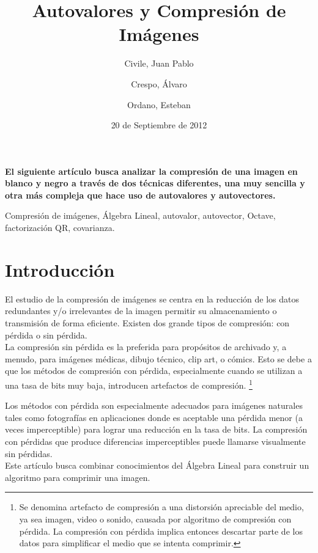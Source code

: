 \documentclass[twocolumn,a4paper,10pt]{article}
\title{Autovalores y Compresión de Imágenes}
\date{20 de Septiembre de 2012}
\author{Civile, Juan Pablo \and Crespo, Álvaro \and Ordano, Esteban }
\begin{document}
\pagestyle{fancy}
\maketitle
\thispagestyle{fancy}

\begin{customabstract}
\textbf{
    El siguiente art\'iculo busca analizar la compresi\'on de una imagen en blanco y negro a trav\'es de dos t\'ecnicas diferentes, una muy sencilla y otra
    m\'as compleja que hace uso de autovalores y autovectores.
}
\end{customabstract}

\begin{keywords}
Compresi\'on de im\'agenes, \'Algebra Lineal, autovalor, autovector, Octave, factorizaci\'on QR, covarianza.
\end{keywords}


\section{Introducci\'on}

El estudio de la compresi\'on de im\'agenes se centra en la reducci\'on de los datos redundantes y/o irrelevantes de la imagen permitir su almacenamiento
o transmisi\'on de forma eficiente. Existen dos grande tipos de compresi\'on: con p\'erdida o sin p\'erdida.\\
La compresi\'on sin p\'erdida es la preferida para propósitos de archivado y, a menudo, para imágenes médicas, dibujo técnico, clip art, o cómics. 
Esto se debe a que los métodos de compresión con p\'erdida, especialmente cuando se utilizan a una tasa de bits muy baja, introducen artefactos de compresión.
\footnote{Se denomina artefacto de compresi\'on a una distorsión apreciable del medio, ya sea imagen, video o sonido, causada por algoritmo de compresi\'on con 
p\'erdida. La compresi\'on con p\'erdida implica entonces descartar parte de los datos para simplificar el medio que se intenta comprimir.}

Los métodos con p\'erdida son especialmente adecuados para imágenes naturales tales como fotografías en aplicaciones donde es aceptable una p\'erdida menor
 (a veces imperceptible) para lograr una reducción en la tasa de bits. La compresión con p\'erdidas que produce diferencias imperceptibles puede llamarse 
visualmente sin p\'erdidas.\\

Este art\'iculo busca combinar conocimientos del \'Algebra Lineal para construir un algoritmo para comprimir una imagen.\\
\end{document}

